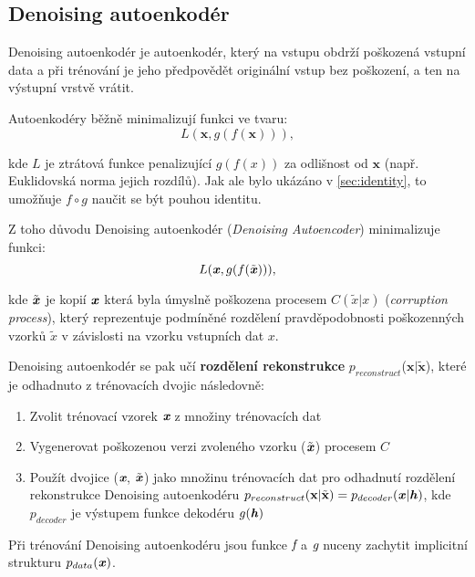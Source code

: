 \subsection{Denoising autoenkodér}
Denoising autoenkodér je autoenkodér, který na vstupu obdrží poškozená vstupní data
a při trénování je jeho předpovědět originální vstup bez poškození, a ten na výstupní vrstvě vrátit.

Autoenkodéry běžně minimalizují funkci ve tvaru:
\begin{equation}
    L(\mathbf{x}, g(f(\mathbf{x}))),
\end{equation}

kde $L$ je ztrátová funkce penalizující $g(f(x))$ za odlišnost od $\mathbf{x}$ (např. Euklidovská norma jejich rozdílů).
Jak ale bylo ukázáno v \autoref{sec:identity}, to umožňuje $f \circ g$ naučit se být pouhou identitu.


Z toho důvodu Denoising autoenkodér (\emph{Denoising Autoencoder}) minimalizuje funkci:
\begin{equation}
    L(\textbf{\emph{x}}, g(f(\tilde{\textbf{\emph{x}}}))),
\end{equation}

kde $\tilde{\textbf{\emph{x}}}$ je kopií $\textbf{\emph{x}}$ která byla úmyslně poškozena procesem $C(\tilde{x} | x)$ (\emph{corruption process}),
který reprezentuje podmíněné rozdělení pravděpodobnosti poškozenných vzorků $\tilde{x}$ v závislosti na vzorku vstupních dat $x$.

Denoising autoenkodér se pak učí \textbf{rozdělení rekonstrukce} $p_{reconstruct}$($\mathbf{x}|\mathbf{\tilde{x}}$),
které je odhadnuto z trénovacích dvojic následovně:

\begin{enumerate}
    \item Zvolit trénovací vzorek $\emph{\textbf{x}}$ z množiny trénovacích dat
    \item Vygenerovat poškozenou verzi zvoleného vzorku ($\tilde{\textbf{\emph{x}}}$) procesem $C$
    \item Použít dvojice ($\emph{\textbf{x}}$, $\tilde{\textbf{\emph{x}}}$) jako množinu trénovacích dat pro odhadnutí rozdělení rekonstrukce Denoising autoenkodéru $p_{reconstruct}(\textbf{x} | \tilde{\textbf{x}}) = p_{decoder}(\textbf{\emph{x}}|\textbf{\emph{h}})$, kde $p_{decoder}$ je výstupem funkce dekodéru $g(\textbf{\emph{h}})$
\end{enumerate}

Při trénování Denoising autoenkodéru jsou funkce $\emph{f}$ a $\emph{g}$ nuceny zachytit implicitní strukturu $p_{data}(\textbf{\emph{x}})$.

